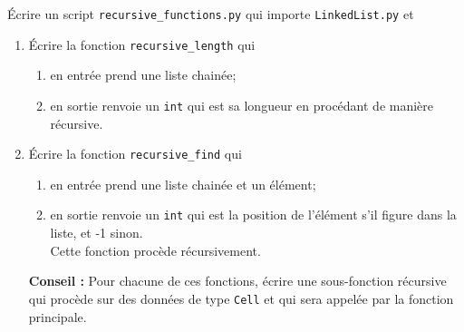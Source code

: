 \documentclass[a4paper,12pt,french]{article}
\begin{document}
\begin{exercice}
\'Ecrire un script \texttt{recursive\_functions.py} qui importe \texttt{LinkedList.py} et
\begin{enumerate}
    \item \'Ecrire la fonction \texttt{recursive_length} qui
    \begin{enumerate}[--]
        \item en entrée prend une liste chainée;
        \item en sortie renvoie un \texttt{int} qui est sa longueur en procédant de manière récursive.
    \end{enumerate}
    \item \'Ecrire la fonction \texttt{recursive_find} qui
    \begin{enumerate}[--]
    \item en entrée prend une liste chainée et un élément;
    \item en sortie renvoie un \texttt{int} qui est la position de l'élément s'il figure dans la liste, et -1 sinon.\\
            Cette fonction procède récursivement.
\end{enumerate}
\textbf{Conseil :} Pour chacune de ces fonctions, écrire une sous-fonction récursive qui procède sur des données de type \texttt{Cell} et qui sera appelée par la fonction principale.
\end{enumerate}
\end{exercice}
\end{document}
